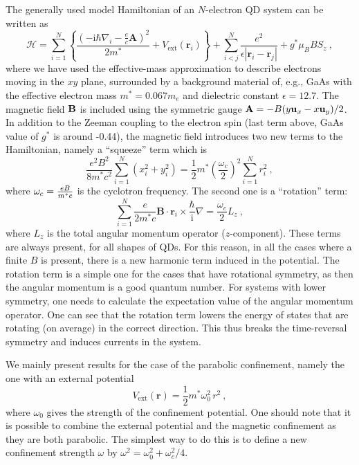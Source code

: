 \documentclass{article}
\begin{document}
The generally used model Hamiltonian of an $N$-electron QD system can
be written as
\begin{equation}
 \mathcal{H}=\sum_{i=1}^N \left\{ \frac{(-\mathrm{i} \hbar \nabla_i
-\frac {e}{c } \mathbf{A})^2}{2 m^*} +
V_{\mathrm{ext}}(\mathbf{r}_i)\right\} + \sum_{i<j}^N
\frac{e^2}{\epsilon|{\mathbf r}_i-{\mathbf r}_j|} +  
g^* \mu_B B S_{z} \ ,
\label{ham}
\end{equation}
where we have used the effective-mass approximation to describe electrons
moving in the $xy$ plane, surrounded by a background material of, e.g., GaAs
with the effective electron mass $m^*=0.067m_e$ and dielectric constant
$\epsilon=12.7$. The magnetic field ${\bf B}$ is included using the symmetric
gauge ${\bf A}=-B(y{\bf u}_x-x{\bf u}_y)/2$. In addition to the Zeeman
coupling to the electron spin (last term above, GaAs value of $g^*$ is around
-0.44), the magnetic field introduces two new terms to the Hamiltonian, namely
a ``squeeze'' term which is
\begin{equation}
\frac{e^2  B^2}{8 m^* c^2} \sum_{i=1}^N (x_i^2+y_i^2) 
=  \frac 12 m^* \left(\frac{\omega_{c}}{2}\right)^2 \sum_{i=1}^N r_i^2 \ ,
\end{equation}
where $\omega_{c}={e { B} \over m^*c}$ is the cyclotron frequency.
The second one is a ``rotation'' term:
\begin{equation}
 \sum_{i=1}^N \frac{e}{2 m^* c} \mathbf{B}\cdot\mathbf{r}_i\times
\frac{\hbar}{\mathrm{i}} \nabla = \frac{\omega_c}{2} L_z \ ,
\end{equation}
where $L_z$ is the total angular momentum operator
($z$-component). These terms are always present, for all shapes of
QDs. For this reason, in all the cases where a finite $B$ is present,
there is a new harmonic term induced in the potential. The rotation
term is a simple one for the cases that have rotational symmetry, as
then the angular momentum is a good quantum number. For systems with
lower symmetry, one needs to calculate the expectation value of the
angular momentum operator. One can see that the rotation term lowers
the energy of states that are rotating (on average) in the correct
direction. This thus breaks the time-reversal symmetry and induces
currents in the system.

We mainly present results for the case of the parabolic confinement,
namely the one with an external potential
\begin{equation}
V_{\mathrm{ext}}(\mathbf{r})=\frac 12 m^* \omega_0^2 \, r^2 \ ,
\end{equation}
where $\omega_0$ gives the strength of the confinement potential. One should
note that it is possible to combine the external potential and the magnetic
confinement as they are both parabolic. The simplest way to do this is to
define a new confinement strength $\omega$ by
$\omega^{2}=\omega_{0}^{2}+{\omega_{c}^{2}/4}$.
\end{document}
